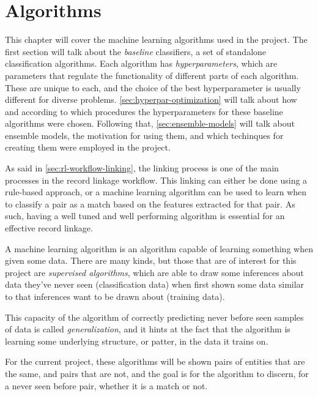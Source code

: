 \documentclass[epsfig,a4paper,11pt,titlepage,twoside,openany]{book}
\begin{document}

\chapter{Algorithms}
\label{chap:algorithms}

This chapter will cover the machine learning algorithms used in the project. The first section will talk about the \textit{baseline} classifiers, a set of standalone classification algorithms. Each algorithm has \textit{hyperparameters}, which are parameters that regulate the functionality of different parts of each algorithm. These are unique to each, and the choice of the best hyperparameter is usually different for diverse problems. \autoref{sec:hyperpar-optimization} will talk about how and according to which procedures the hyperparameters for these baseline algorithms were chosen. Following that, \autoref{sec:ensemble-models} will talk about ensemble models, the motivation for using them, and which techinques for creating them were employed in the project.

As said in \autoref{sec:rl-workflow-linking}, the linking process is one of the main processes in the record linkage workflow. This linking can either be done using a rule-based approach, or a machine learning algorithm can be used to learn when to classify a pair as a match based on the features extracted for that pair. As such, having a well tuned and well performing algorithm is essential for an effective record linkage.

A machine learning algorithm \cite{Russell:2009:AIM:1671238} is an algorithm capable of learning something when given some data. There are many kinds, but those that are of interest for this project are \textit{supervised algorithms}, which are able to draw some inferences about data they've never seen (classification data) when first shown some data similar to that inferences want to be drawn about (training data). 

This capacity of the algorithm of correctly predicting never before seen samples of data is called \textit{generalization}, and it hints at the fact that the algorithm is learning some underlying structure, or patter, in the data it trains on.

For the current project, these algorithms will be shown pairs of entities that are the same, and pairs that are not, and the goal is for the algorithm to discern, for a never seen before pair, whether it is a match or not.
\end{document}
